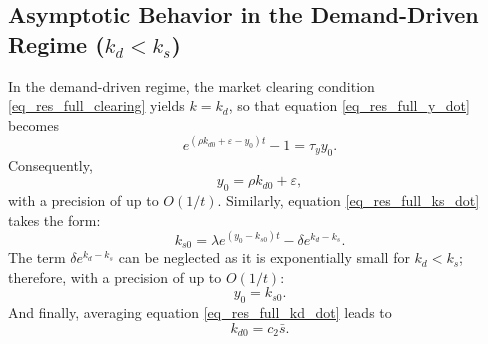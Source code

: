 
\subsection{Asymptotic Behavior in the Demand-Driven Regime ($k_d<k_s$)}
In the demand-driven regime, the market clearing condition \eqref{eq_res_full_clearing} yields $k=k_{d}$, so that equation \eqref{eq_res_full_y_dot} becomes
\begin{equation}
e^{(\rho k_{d0}+\varepsilon - y_0) t} - 1 = \tau_y y_0.
\end{equation}
Consequently, 
\begin{equation}\label{eq_lt_demand_y0}
y_0 = \rho k_{d0}+\varepsilon,
\end{equation}
with a precision of up to $O(1/t)$. Similarly, equation \eqref{eq_res_full_ks_dot} takes the form: 
\begin{equation}
k_{s0} = \lambda e^{(y_0-k_{s0})t} - \delta e^{k_d-k_s}.
\end{equation}
The term $\delta e^{k_d-k_s}$ can be neglected as it is exponentially small for $k_d<k_s$; therefore, with a precision of up to $O(1/t)$:
\begin{equation}\label{eq_lt_demand_ks0}
y_0 = k_{s0}.
\end{equation}
And finally, averaging equation \eqref{eq_res_full_kd_dot} leads to
\begin{equation}\label{eq_lt_demand_kd0}
	k_{d0} = c_2 \bar{s}.
\end{equation}

